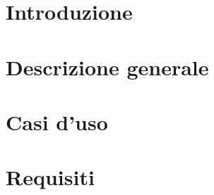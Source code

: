 \documentclass[11pt,a4paper]{article}
\begin{document}
	\section{Introduzione}
			
		\newpage	
	\section{Descrizione generale}
		
		
		\newpage	
	\section{Casi d'uso}
		
		
		\newpage	
	\section{Requisiti}
		
		
		\newpage
		\appendix
		
		
\end{document}
